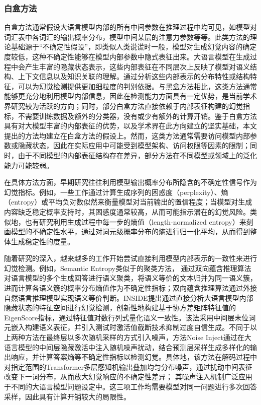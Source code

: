 \subsubsection{白盒方法}

白盒方法通常假设大语言模型内部的所有中间参数在推理过程中均可见，如模型对词汇表中各词汇的输出概率分布，模型中间某层的注意力参数等等。此类方法的理论基础源于“不确定性假设”，即类似人类说谎时一般，模型对生成幻觉内容的确定度较低，这种不确定性能够在模型内部参数中隐式表征出来。大语言模型在生成过程中会产生丰富的隐藏状态表示，这些内部表征在不同层次上反映了模型对语义结构、上下文信息以及知识关联的理解。通过分析这些内部表示的分布特性或结构特征，可以为幻觉检测提供更加细粒度的判别依据。与黑盒方法相比，这类方法通常能够更充分地利用模型内部信息，因此在检测能力方面具有一定优势，是当前学术界研究较为活跃的方向；同时，部分白盒方法直接依赖于内部表征构建的幻觉指标，不需要训练数据及额外的分类器，没有或少有额外的计算开销。鉴于白盒方法具有对大模型丰富的内部表征的优势，以及学术界在此方向建立的坚实基础，本文提出的方法均建立在白盒方法的假设上。然而，这类方法通常需要访问模型内部参数或隐藏状态，因此在实际应用中可能受到模型架构、访问权限等因素的限制；同时，由于不同模型的内部表征结构存在差异，部分方法在不同模型或领域上的泛化能力可能较弱。

在具体方法方面，早期研究往往利用模型输出概率分布所隐含的不确定性信号作为幻觉指标。例如，一些工作通过计算生成序列的困惑度（perplexity）、熵（entropy）或平均负对数似然来衡量模型对当前输出的置信程度\cite{manakul2023selfcheckgpt,sriramanan2024llm,chen2024inside,liu2025enhancing}；当模型对生成内容缺乏稳定概率支持时，其困惑度通常较高，从而可能指示潜在的幻觉风险。类似地，也有研究利用生成过程中每一步的熵值（length-normalized entropy\cite{chen2024inside,liu2025enhancing}）来刻画模型的不确定性水平，通过对词元级概率分布的熵进行归一化平均，从而得到整体生成稳定性的度量。

随着研究的深入，越来越多的工作开始尝试直接利用模型内部表示的一致性来进行幻觉检测。例如，Semantic Entropy\cite{kuhn2023semantic}类似于的聚类方法， 通过双向蕴含推理算法对语言模型的多个生成回答进行语义聚类，将语义等价的文本归并为同一语义簇，进而计算各语义簇的概率分布熵值作为不确定性指标；双向蕴含推理算法通过外接自然语言推理模型实现语义等价判断。INSIDE\cite{chen2024inside}提出通过直接分析大语言模型内部隐藏状态的特征空间进行幻觉检测，创新性地构建基于协方差矩阵特征值的EigenScore指标，通过特征值对数行列式量化语义一致性。该法采用中间层末位词元嵌入构建语义表征，并引入测试时激活值截断技术抑制过度自信生成。不同于以上两种方法在最终层以多次随机采样的方式引入噪声，方法Noise Inject\cite{liu2025enhancing}通过在大语言模型的中间层隐藏激活中注入随机噪声扰动，结合预测层采样生成多样化的输出响应，并计算答案熵等不确定性指标以检测幻觉。具体地，该方法在解码过程中对指定范围的Transformer多层感知机输出叠加均匀分布噪声，通过扰动中间表征改变下一词分布，从而放大幻觉响应的不确定性差异； 其噪声注入机制广泛应用于不同的大语言模型问题设定中。这三项工作均需要模型对同一问题进行多次回答采样，因此具有计算开销较大的局限性。

